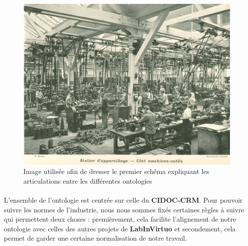 \begin{figure} [H]
    \centering
    \includegraphics[width=1\textwidth]{assets/ontologie/Atelier d'appareillage - cÃ´tÃ© machines outils.jpg}
    \caption{Image utilisée afin de dresser le premier schéma expliquant les articulations entre les différentes ontologies}
    \label{fig:photoInspiSchemaBase}
\end{figure}

\paragraph{} \hspace{10mm}
L'ensemble de l'ontologie est centrée sur celle du \textbf{CIDOC-CRM}. Pour pouvoir suivre les normes de l'industrie, nous nous sommes fixés certaines règles à suivre qui permettent deux choses : premièrement, cela facilite l'alignement de notre ontologie avec celles des autres projets de \textbf{LabInVirtuo} et secondement, cela permet de garder une certaine normalisation de notre travail.

